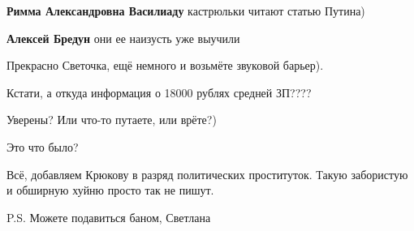 \begin{itemize}
\begin{itemize}
\textbf{Римма Александровна Василиаду} кастрюльки читают статью Путина)

 
\textbf{Алексей Бредун} они ее наизусть уже выучили
\end{itemize}

 

Прекрасно Светочка, ещё немного и возьмёте звуковой барьер).

 
Кстати, а откуда информация о 18000 рублях средней ЗП????

Уверены? Или что-то путаете, или врёте?)

 
Это что было?

 

Всё, добавляем Крюкову в разряд политических проституток. Такую забористую и
обширную хуйню просто так не пишут.

P.S. Можете подавиться баном, Светлана

 


\end{itemize}
